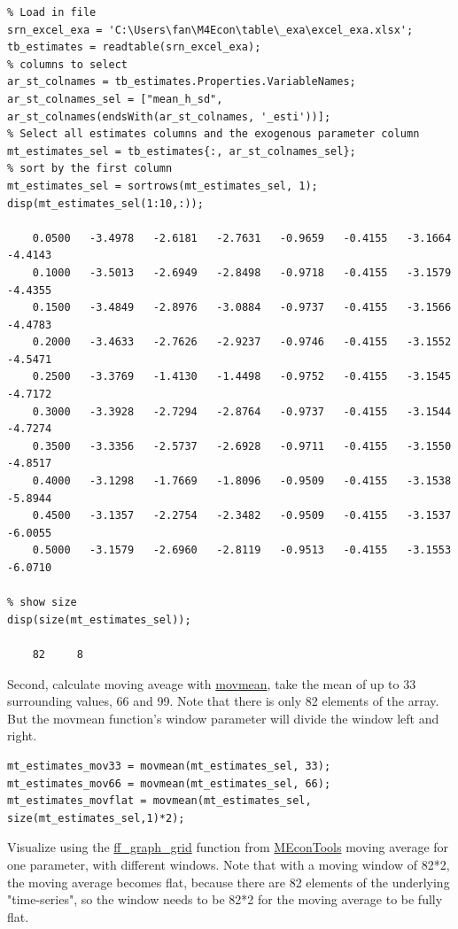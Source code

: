 \documentclass[
]{book}
\begin{document}
\begin{verbatim}
% Load in file
srn_excel_exa = 'C:\Users\fan\M4Econ\table\_exa\excel_exa.xlsx';
tb_estimates = readtable(srn_excel_exa);
% columns to select
ar_st_colnames = tb_estimates.Properties.VariableNames;
ar_st_colnames_sel = ["mean_h_sd", ar_st_colnames(endsWith(ar_st_colnames, '_esti'))];
% Select all estimates columns and the exogenous parameter column
mt_estimates_sel = tb_estimates{:, ar_st_colnames_sel};
% sort by the first column
mt_estimates_sel = sortrows(mt_estimates_sel, 1);
disp(mt_estimates_sel(1:10,:));

    0.0500   -3.4978   -2.6181   -2.7631   -0.9659   -0.4155   -3.1664   -4.4143
    0.1000   -3.5013   -2.6949   -2.8498   -0.9718   -0.4155   -3.1579   -4.4355
    0.1500   -3.4849   -2.8976   -3.0884   -0.9737   -0.4155   -3.1566   -4.4783
    0.2000   -3.4633   -2.7626   -2.9237   -0.9746   -0.4155   -3.1552   -4.5471
    0.2500   -3.3769   -1.4130   -1.4498   -0.9752   -0.4155   -3.1545   -4.7172
    0.3000   -3.3928   -2.7294   -2.8764   -0.9737   -0.4155   -3.1544   -4.7274
    0.3500   -3.3356   -2.5737   -2.6928   -0.9711   -0.4155   -3.1550   -4.8517
    0.4000   -3.1298   -1.7669   -1.8096   -0.9509   -0.4155   -3.1538   -5.8944
    0.4500   -3.1357   -2.2754   -2.3482   -0.9509   -0.4155   -3.1537   -6.0055
    0.5000   -3.1579   -2.6960   -2.8119   -0.9513   -0.4155   -3.1553   -6.0710

% show size
disp(size(mt_estimates_sel));

    82     8
\end{verbatim}

Second, calculate moving aveage with
\href{https://www.mathworks.com/help/matlab/ref/movmean.html\#bu6jxup}{movmean},
take the mean of up to 33 surrounding values, 66 and 99. Note that there
is only 82 elements of the array. But the movmean function's window
parameter will divide the window left and right.

\begin{verbatim}
mt_estimates_mov33 = movmean(mt_estimates_sel, 33);
mt_estimates_mov66 = movmean(mt_estimates_sel, 66);
mt_estimates_movflat = movmean(mt_estimates_sel, size(mt_estimates_sel,1)*2);
\end{verbatim}

Visualize using the
\href{https://fanwangecon.github.io/MEconTools/MEconTools/doc/graph/htmlpdfm/fx_graph_grid.html}{ff\_graph\_grid}
function from \href{https://fanwangecon.github.io/MEconTools/}{MEconTools}
moving average for one parameter, with different windows. Note that with
a moving window of 82*2, the moving average becomes flat, because there
are 82 elements of the underlying "time-series", so the window needs
to be 82*2 for the moving average to be fully flat.
\end{document}
